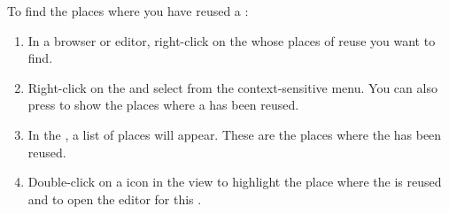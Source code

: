 To find the places where you have reused a \gdcase{}:
\begin{enumerate}
\item In a browser or editor, right-click on the \gdcase{} whose places of reuse  you want to find.
\item Right-click on the \gdcase{}  and select  from the context-sensitive menu. You can also press  to show the places where a \gdcase{} has been reused.
\item In the , a list of places will appear.
These are the places where the \gdcase{} has been reused. 
\item Double-click on a \gdcase{} icon in the view to highlight the place where the \gdcase{} is reused  and to open the editor for this \gdcase{}.
\end{enumerate}
